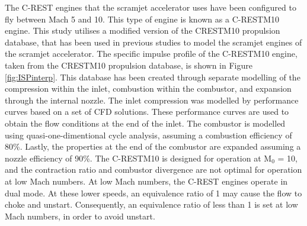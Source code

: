 The C-REST engines that the scramjet accelerator uses have been configured to fly between Mach 5 and 10. This type of engine is known as a C-RESTM10 engine\cite{Preller2017b}.  
This study utilises a modified version of the \textsf{CRESTM10} propulsion database, that has been used in previous studies to model the scramjet engines of the scramjet accelerator\cite{Preller2017b}. The specific impulse profile of the C-RESTM10 engine, taken from the \textsf{CRESTM10} propulsion database, is shown in Figure \ref{fig:ISPinterp}. This database has been created through separate modelling of the compression within the inlet, combustion within the combustor, and expansion through the internal nozzle\cite{Jazra2010,Preller2018a}. The inlet compression was modelled by performance curves based on a set of CFD solutions\cite{Jazra2010,Preller2018a}. These performance curves are used to obtain the flow conditions at the end of the inlet. The combustor is modelled using quasi-one-dimentional cycle analysis, assuming a combustion efficiency of 80\%\cite{Jazra2010,Preller2018a}. Lastly, the properties at the end of the combustor are expanded assuming a nozzle efficiency of 90\%\cite{Preller2018a}.
The C-RESTM10 is designed for operation at M$_0$ = 10, and the contraction ratio and combustor divergence are not optimal for operation at low Mach numbers. At low Mach numbers, the C-REST engines operate in dual mode\cite{Preller2017b,Curran2016}. At these lower speeds, an equivalence ratio of 1 may cause the flow to choke and unstart. 
Consequently, an equivalence ratio of less than 1 is set at low Mach numbers, in order to avoid unstart\cite{Preller2018a}. 
